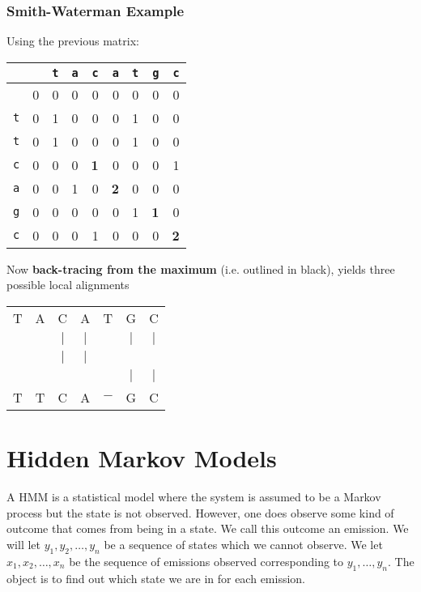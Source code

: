 \documentclass{article}
\numberwithin{equation}{section}
\begin{document}
\subsubsection{Smith-Waterman Example}

Using the previous matrix:

\begin{center}
\begin{tabular}{|c|rrrrrrrr|}\hline
              &      &{\tt t}    &{\tt a}      &{\tt c} &{\tt a}     &{\tt t}     &{\tt g} &{\tt c}\\ \hline%
              & 0   & 0  &0  & 0  & 0  & 0  & 0 & 0\\
 \texttt{t} & 0  & 1 & 0 & 0 & 0 & 1 & 0 & 0\\
 \texttt{t} & 0  & 1 & 0 & 0 & 0 & 1 & 0 & 0\\
 \texttt{c} & 0  & 0 & 0 & {\bf 1} & 0 & 0 & 0 & 1\\
 \texttt{a} & 0  & 0 & 1 & 0 & {\bf 2} & 0 & 0 & 0\\
 \texttt{g} & 0 & 0 & 0 & 0 & 0 & 1 & {\bf 1} & 0 \\
 \texttt{c} & 0 & 0 & 0 & 1 & 0 & 0 & 0 & {\bf 2} \\\hline
 \end{tabular}
\end{center}

Now {\bf back-tracing from the maximum}  (i.e. outlined in black), yields three possible local alignments

\begin{center}
\begin{tabular}{ccccccc}
T & A & C &  A &  T &  G & C \\
 &  & $\mid$ & $\mid$ & & $\mid$ & $\mid$ \\
 &  & $\mid$ & $\mid$ & &  & \\
 &  & & & & $\mid$ & $\mid$  \\
T & T & C & A & $-$ & G & C \\
\end{tabular}
\end{center}

\section{Hidden Markov Models}

A HMM is a statistical model where the system is assumed to be a
Markov process but the state is not observed. However, one does
observe some kind of outcome that comes from being in a state.  We
call this outcome an emission.  We will let $y_1,y_2,\ldots,y_n$ be
a sequence of states which we cannot observe.  We let
$x_1,x_2,\ldots,x_n$ be the sequence of emissions observed
corresponding to $y_1,\ldots,y_n$.  The object is to find out which
state we are in for each emission.
\end{document}
